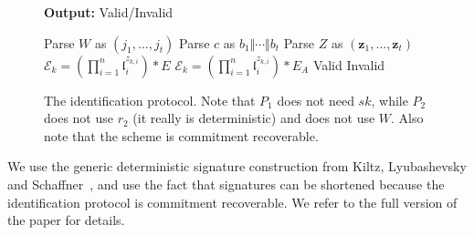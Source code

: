 \documentclass{llncs}
\newcommand{\E}{\mathcal{E}}
\newcommand{\msg}{\mathsf{msg}}
\renewcommand{\l}{\mathfrak{l}}
\newcommand{\z}{\mathbf{z}}
\newcommand{\PP}{\mathsf{P}}
\newcommand{\St}{\textsf{st}}
\newcommand{\PRF}{\mathsf{PRF}}
\newcommand{\longversion}[1]{}
\newcommand{\shortversion}[1]{#1}
\begin{document}
\begin{figure}
\begin{minipage}{0.45\textwidth}
\begin{algorithm}[H]
	\textbf{Output:} Valid/Invalid

	\begin{algorithmic}[1]
		\State Parse $W$ as $(j_1 , \dots, j_t)$
		\State Parse $c$ as $b_1 \Vert \cdots \Vert b_t$
		\State Parse $Z$ as $(\z_1, \dots, \z_t)$
		\State $\E_k = ( \prod_{i=1}^n \l_i^{z_{k,i}} ) * E$
		\Else
		\State $\E_k = ( \prod_{i=1}^n \l_i^{z_{k,i}} ) * E_A$
		\EndIf
		\EndFor
		\If{$(j_1, \dots, j_t) = (j(\E_1) , \dots, j(\E_t))$} \State \Return Valid
		\Else \State \Return Invalid \EndIf
	\end{algorithmic}
\end{algorithm}
\end{minipage}
\caption{The identification protocol. Note that $P_1$ does not need $sk$, while $P_2$ does not use $r_2$ (it really is deterministic) and does not use $W$. Also note that the scheme is commitment recoverable. \label{fig:id-scheme}}
\end{figure}


\shortversion{
We use the generic deterministic signature construction from Kiltz, Lyubashevsky and Schaffner~\cite{KLS18}, and use the fact that signatures can be shortened because the identification protocol is commitment recoverable. We refer to the full version of the paper for details.
}
\longversion{
Now we state the generic deterministic signature construction from Kiltz, Lyubashevsky and Schaffner~\cite{KLS18}:
The key generation and verification algorithms are the same as Figure~\ref{fig:id-scheme}. The signing algorithm is given in Figure~\ref{fig:sign}. 
Since the identification protocol is commitment recoverable, the signatures can be shortened to be $(c, Z )$ instead of $(W,Z)$.

\begin{figure}
\begin{algorithm}[H]
	\caption{Deterministic Signing algorithm}
	\textbf{Input:} $(pk,sk)$, $K$, $\msg$

	\textbf{Output:} $\sigma$

	\begin{algorithmic}[1]
		\State $l = 0$, $Z = \perp$
		\While{$Z = \perp$ and $l \le l_0$}
		\State $(W,\St) = \PP_1( sk, \PRF_K( 0, \msg, l ))$
		\State $c = H( W, \msg )$ 
		\State $Z = \PP_2( sk, W, c, \St, \PRF_K( 1, \msg, l ))$
		\EndWhile
		\If{$Z = \perp$}
		\State \Return $\perp$
		\Else
		\State \Return $(W,Z)$
		\EndIf
	\end{algorithmic}
\end{algorithm}
\caption{The deterministic signature scheme of Kiltz, Lyubashevsky and Schaffner~\cite{KLS18}. Here $K$ is a PRF key that is internal to the signing algorithm and is not required for verification. \label{fig:sign}}
\end{figure}
}
\end{document}
